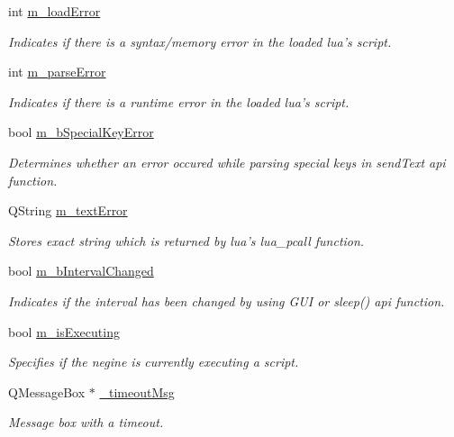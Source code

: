 \begin{DoxyCompactItemize}
int \hyperlink{class_lua_engine_af8dca74620280060399b5b7dd937af44}{m\-\_\-load\-Error}
\begin{DoxyCompactList}\small\item\em Indicates if there is a syntax/memory error in the loaded lua's script. \end{DoxyCompactList}\item 
int \hyperlink{class_lua_engine_ac7c65e343f73a0dadcbe2d5f1a5842f3}{m\-\_\-parse\-Error}
\begin{DoxyCompactList}\small\item\em Indicates if there is a runtime error in the loaded lua's script. \end{DoxyCompactList}\item 
bool \hyperlink{class_lua_engine_a5cac380e1359eb5a6cf95239e4ad2b19}{m\-\_\-b\-Special\-Key\-Error}
\begin{DoxyCompactList}\small\item\em Determines whether an error occured while parsing special keys in send\-Text api function. \end{DoxyCompactList}\item 
Q\-String \hyperlink{class_lua_engine_a0cb5dc043a3f9b162ad97245cd7e6956}{m\-\_\-text\-Error}
\begin{DoxyCompactList}\small\item\em Stores exact string which is returned by lua's lua\-\_\-pcall function. \end{DoxyCompactList}\item 
bool \hyperlink{class_lua_engine_add74083d158ee3543d0644c0b6349c5d}{m\-\_\-b\-Interval\-Changed}
\begin{DoxyCompactList}\small\item\em Indicates if the interval has been changed by using G\-U\-I or sleep() api function. \end{DoxyCompactList}\item 
bool \hyperlink{class_lua_engine_ad2bf267f4030d958e5a6f88a3a19e039}{m\-\_\-is\-Executing}
\begin{DoxyCompactList}\small\item\em Specifies if the negine is currently executing a script. \end{DoxyCompactList}\item 
Q\-Message\-Box $\ast$ \hyperlink{class_lua_engine_a427a0ecc61c8b6b06bc0b4e86f32ae2d}{\-\_\-timeout\-Msg}
\begin{DoxyCompactList}\small\item\em Message box with a timeout. \end{DoxyCompactList}\end{DoxyCompactItemize}
